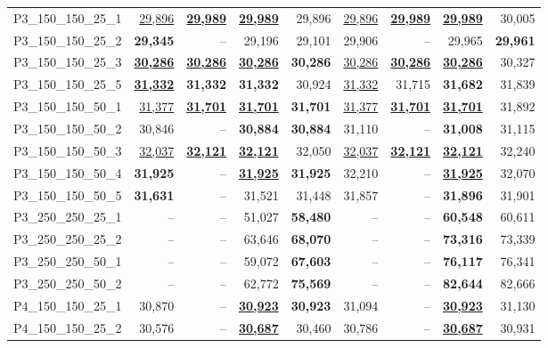 \documentclass[smallextended]{svjour3}       %
\begin{document}
\begin{table}
\begin{tabular}{lrrrrrrrr}
P3\_150\_150\_25\_1 & \underline{29,896} & \underline{\textbf{29,989}} & \underline{\textbf{29,989}} & 29,896 & \underline{29,896} & \underline{\textbf{29,989}} & \underline{\textbf{29,989}} & 30,005 \\
P3\_150\_150\_25\_2 & \textbf{29,345} & -- & 29,196 & 29,101 & 29,906 & -- & 29,965 & \textbf{29,961} \\
P3\_150\_150\_25\_3 & \underline{\textbf{30,286}} & \underline{\textbf{30,286}} & \underline{\textbf{30,286}} & \textbf{30,286} & \underline{30,286} & \underline{\textbf{30,286}} & \underline{\textbf{30,286}} & 30,327 \\
P3\_150\_150\_25\_5 & \underline{\textbf{31,332}} & \textbf{31,332} & \textbf{31,332} & 30,924 & \underline{31,332} & 31,715 & \textbf{31,682} & 31,839 \\
P3\_150\_150\_50\_1 & \underline{31,377} & \underline{\textbf{31,701}} & \underline{\textbf{31,701}} & \textbf{31,701} & \underline{31,377} & \underline{\textbf{31,701}} & \underline{\textbf{31,701}} & 31,892 \\
P3\_150\_150\_50\_2 & 30,846 & -- & \textbf{30,884} & \textbf{30,884} & 31,110 & -- & \textbf{31,008} & 31,115 \\
P3\_150\_150\_50\_3 & \underline{32,037} & \underline{\textbf{32,121}} & \underline{\textbf{32,121}} & 32,050 & \underline{32,037} & \underline{\textbf{32,121}} & \underline{\textbf{32,121}} & 32,240 \\
P3\_150\_150\_50\_4 & \textbf{31,925} & -- & \underline{\textbf{31,925}} & \textbf{31,925} & 32,210 & -- & \underline{\textbf{31,925}} & 32,070 \\
P3\_150\_150\_50\_5 & \textbf{31,631} & -- & 31,521 & 31,448 & 31,857 & -- & \textbf{31,896} & 31,901 \\
P3\_250\_250\_25\_1 & -- & -- & 51,027 & \textbf{58,480} & -- & -- & \textbf{60,548} & 60,611 \\
P3\_250\_250\_25\_2 & -- & -- & 63,646 & \textbf{68,070} & -- & -- & \textbf{73,316} & 73,339 \\
P3\_250\_250\_50\_1 & -- & -- & 59,072 & \textbf{67,603} & -- & -- & \textbf{76,117} & 76,341 \\
P3\_250\_250\_50\_2 & -- & -- & 62,772 & \textbf{75,569} & -- & -- & \textbf{82,644} & 82,666 \\
P4\_150\_150\_25\_1 & 30,870 & -- & \underline{\textbf{30,923}} & \textbf{30,923} & 31,094 & -- & \underline{\textbf{30,923}} & 31,130 \\
P4\_150\_150\_25\_2 & 30,576 & -- & \underline{\textbf{30,687}} & 30,460 & 30,786 & -- & \underline{\textbf{30,687}} & 30,931 \\

\end{tabular}
\end{table}
\end{document}
